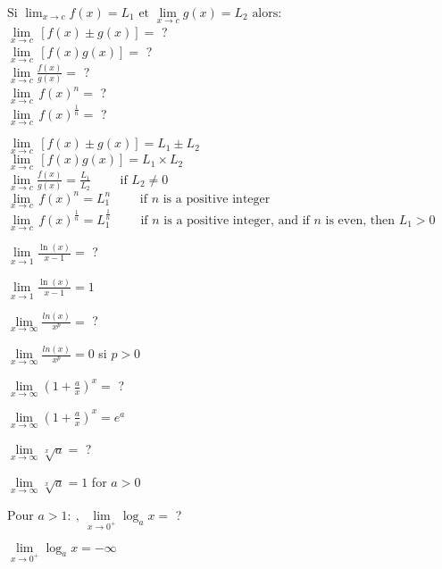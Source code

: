 \documentclass[12pt]{article}
\newcommand*{\xfield}[1]{\begin{mdframed}\centering #1\end{mdframed}\bigskip}
\newenvironment{note}{}{}
\begin{document}
\begin{note}
    \xfield{$\text{Si }\lim_{x \to c} f(x) = L_1 \text{ et }\lim\limits_{x \to c} g(x) = L_2 \text{ alors:}$ \\ $\lim\limits_{x \to c} \, [f(x) \pm g(x)] = $ ? \\$\lim\limits_{x \to c} \, [f(x)g(x)] =$ ? \\ $\lim\limits_{x \to c} \frac{f(x)}{g(x)} =$ ?\\ $\lim\limits_{x \to c} \, f(x)^n =$ ?\\ $\lim\limits_{x \to c} \, f(x)^\frac {1} {n} =$ ?}
    \xfield{$\lim\limits_{x \to c} \, [f(x) \pm g(x)] = L_1 \pm L_2$\\$\lim\limits_{x \to c} \, [f(x)g(x)] = L_1 \times L_2$ \\ $\lim\limits_{x \to c} \frac{f(x)}{g(x)} = \frac{L_1}{L_2} \qquad \text{ if } L_2 \ne 0$ \\ $\lim\limits_{x \to c} \, f(x)^n = L_1^n \qquad \text{ if }n \text{ is a positive integer}$ \\ $\lim\limits_{x \to c} \, f(x)^\frac {1} {n} = L_1^\frac {1}{n} \qquad \text{ if }n \text{ is a positive integer, and if } n \text{ is even, then } L_1 > 0$}
\end{note}

\begin{note}
	\xfield{$\lim\limits_{x\to1}\frac{\ln(x)}{x-1}=$ ?}
	\xfield{$\lim\limits_{x\to1}\frac{\ln(x)}{x-1}=1$}
\end{note}

\begin{note}
	\xfield{$\lim\limits_{x\to \infty} \frac{ln(x)}{x^p}= $ ?}
	\xfield{$\lim\limits_{x\to \infty} \frac{ln(x)}{x^p}= 0$ si $p>0$}
\end{note}

\begin{note}
	\xfield{$\lim\limits_{x \to \infty}(1+\frac{a}{x})^x = $ ?}
	\xfield{$\lim\limits_{x \to \infty}(1+\frac{a}{x})^x = e^a$}
\end{note}


\begin{note}
	\xfield{$\lim\limits_{x \to \infty} \sqrt[x]{a} =$ ?}
	\xfield{$\lim\limits_{x \to \infty} \sqrt[x]{a} = 1$ for $a > 0$}
\end{note}

\begin{note}
	\xfield{$\mbox{Pour } a > 1:\ ,\ \lim\limits_{x \to 0^+} \log_a x = $ ?}
	\xfield{$\lim\limits_{x \to 0^+} \log_a x = -\infty$}
\end{note}
\end{document}
